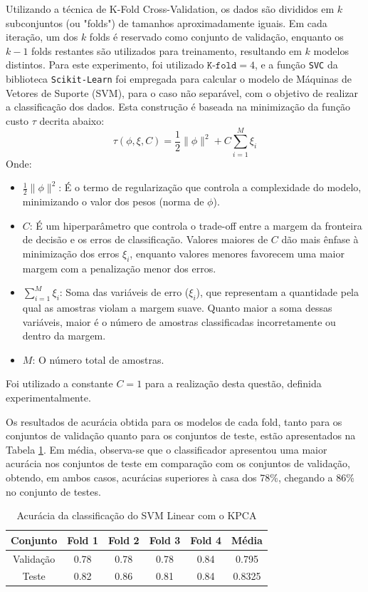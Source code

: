 \documentclass[]{abntex2}
\begin{document}
Utilizando a técnica de K-Fold Cross-Validation, os dados são divididos em \( k \) subconjuntos (ou "folds") de tamanhos aproximadamente iguais. Em cada iteração, um dos \( k \) folds é reservado como conjunto de validação, enquanto os \( k-1 \) folds restantes são utilizados para treinamento, resultando em \( k \) modelos distintos. Para este experimento, foi utilizado \( \texttt{K-fold} = 4 \), e a função \texttt{SVC} da biblioteca \texttt{Scikit-Learn} foi empregada para calcular o modelo de Máquinas de Vetores de Suporte (SVM), para o caso não separável, com o objetivo de realizar a classificação dos dados. Esta construção é baseada na minimização da função custo $\tau$ decrita abaixo:
\[
\tau(\phi, \xi, C) = \frac{1}{2} \|\phi\|^2 + C \sum_{i=1}^{M} \xi_i
\]
Onde:
\begin{itemize}
    \item \(\frac{1}{2} \|\phi\|^2\): É o termo de regularização que controla a complexidade do modelo, minimizando o valor dos pesos (norma de \(\phi\)).
    \item \(C\): É um hiperparâmetro que controla o trade-off entre a margem da fronteira de decisão e os erros de classificação. Valores maiores de \(C\) dão mais ênfase à minimização dos erros \(\xi_i\), enquanto valores menores favorecem uma maior margem com a penalização menor dos erros.
    \item \(\sum_{i=1}^{M} \xi_i\): Soma das variáveis de erro (\(\xi_i\)), que representam a quantidade pela qual as amostras violam a margem suave. Quanto maior a soma dessas variáveis, maior é o número de amostras classificadas incorretamente ou dentro da margem.
    \item \(M\): O número total de amostras.
\end{itemize}

Foi utilizado a constante $C=1$ para a realização desta questão, definida experimentalmente.

Os resultados de acurácia obtida para os modelos de cada fold, tanto para os conjuntos de validação quanto para os conjuntos de teste, estão apresentados na Tabela \ref{tab:kpca_svm}. Em média, observa-se que o classificador apresentou uma maior acurácia nos conjuntos de teste em comparação com os conjuntos de validação, obtendo, em ambos casos, acurácias superiores à casa dos 78\%, chegando a 86\% no conjunto de testes.

\begin{table}[H]
    \centering
    \begin{tabular}{|c|c|c|c|c|c|}
    \hline
    \rowcolor[HTML]{C0C0C0} 
    Conjunto                          & Fold 1 & Fold 2 & Fold 3 & Fold 4 & Média  \\ \hline
    \cellcolor[HTML]{C0C0C0}Validação & 0.78   & 0.78   & 0.78   & 0.84   & 0.795  \\ \hline
    \cellcolor[HTML]{C0C0C0}Teste     & 0.82   & 0.86   & 0.81   & 0.84   & 0.8325 \\ \hline
    \end{tabular}
    \caption{Acurácia da classificação do SVM Linear com o KPCA}
    \label{tab:kpca_svm}
\end{table}
\end{document}
